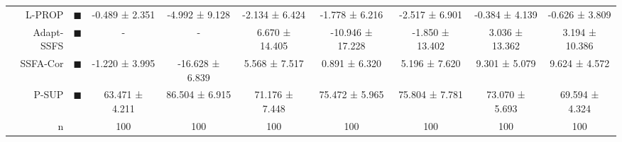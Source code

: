 \begin{tabular}{rcccccccc}
L-PROP     &                     \textcolor{LABEL_PROPAGATION}{\LARGE $\blacksquare$} &          -0.489 ± 2.351 &          -4.992 ± 9.128 &            -2.134 ± 6.424 &          -1.778 ± 6.216 &           -2.517 ± 6.901 &           -0.384 ± 4.139 &           -0.626 ± 3.809 \\
Adapt-SSFS &                              \textcolor{ASSFSCMR}{\LARGE $\blacksquare$} &               - &               - &            6.670 ± 14.405 &        -10.946 ± 17.228 &          -1.850 ± 13.402 &           3.036 ± 13.362 &           3.194 ± 10.386 \\
SSFA-Cor   &                              \textcolor{SFAMCAMT}{\LARGE $\blacksquare$} &          -1.220 ± 3.995 &         -16.628 ± 6.839 &             5.568 ± 7.517 &           0.891 ± 6.320 &            5.196 ± 7.620 &            9.301 ± 5.079 &            9.624 ± 4.572 \\
P-SUP      &         \textcolor{PARTIAL_SUPERVISED_CLASSIFIER}{\LARGE $\blacksquare$} &          63.471 ± 4.211 &          86.504 ± 6.915 &            71.176 ± 7.448 &          75.472 ± 5.965 &           75.804 ± 7.781 &           73.070 ± 5.693 &           69.594 ± 4.324 \\
n          &                                                                          &                     100 &                     100 &                       100 &                     100 &                      100 &                      100 &                      100 \\
\bottomrule
\end{tabular}
